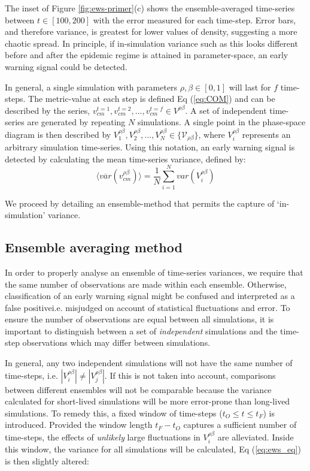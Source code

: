 The inset of Figure \ref{fig:ews-primer}(c) shows the ensemble-averaged time-series between %
$t\in [100, 200]$ with the error measured for each time-step. Error bars, and therefore variance, %
is greatest for lower values of density, suggesting a more chaotic spread. %
In principle, if in-simulation variance such as this looks different before and %
after the epidemic regime is attained in parameter-space, an early warning signal could be detected. %

In general, a single simulation with parameters $\rho, \beta \in [0, 1]$ will last for $f$ time-steps. %
The metric-value at each step is defined Eq (\ref{eq:COM}) and can be described by the series, $v_{cm}^{t=1}, v_{cm}^{t=2},..., v_{cm}^{t=f} \in V^{\rho\beta}$. %
A set of independent time-series are generated by repeating $N$ simulations. %
A single point in the phase-space diagram is then described by $V_1^{\rho\beta}, V_2^{\rho \beta},..., V_N^{\rho\beta} \in \{\mathcal{V}_{\rho\beta}\}$, %
where $V_i^{\rho\beta}$ represents an arbitrary simulation time-series. %
Using this notation, an early warning signal is detected by calculating the mean time-series variance, %
defined by:
\begin{equation}
\label{eq:ews_eq}
    \big\langle \overline{var}(v^{\rho\beta}_{cm}) \big\rangle = \frac{1}{N}\sum\limits_{i=1}^{N} var(V_i^{\rho\beta})
\end{equation}

We proceed by detailing an ensemble-method that permits the capture of `in-simulation' variance. %

\subsection{Ensemble averaging method}

In order to properly analyse an ensemble of time-series variances, we require that the same %
number of observations are made within each ensemble. %
Otherwise, classification of an early warning signal might be confused and interpreted as %
a false positive\textemdash i.e. misjudged on account of statistical fluctuations and error. %
To ensure the number of observations are equal between all simulations, %
it is important to distinguish between a set of \textit{independent} simulations and the %
time-step observations which may differ between simulations. %

In general, any two independent simulations will not have the same number of time-steps, %
i.e. $|V_i^{\rho\beta}| \neq |V_j^{\rho\beta}|$. %
If this is not taken into account, comparisons between different ensembles will not be %
comparable because the variance calculated for short-lived simulations will be more error-prone %
than long-lived simulations. %
To remedy this, a fixed window of time-steps ($t_O\leq t \leq t_F$) is introduced. %
Provided the window length $t_F-t_O$ captures a sufficient number of time-steps, the effects %
of \textit{unlikely} large fluctuations in $V_i^{\rho\beta}$ are alleviated. Inside this window, %
the variance for all simulations will be calculated, Eq (\ref{eq:ews_eq}) is then slightly altered: %


